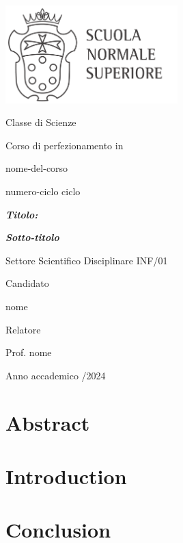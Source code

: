 \documentclass[12pt, draft, twoside]{report} %
\newcommand\la{\textlangle\xspace}
\newcommand\ra{\textrangle\xspace}
\begin{document}

\begin{titlepage}
{
\ifdefined\IsRoboto
{}\selectfont
\fi
    
   \centering
   \vspace*{-3.5cm}
   \includegraphics[width=0.5\textwidth]{sns_logo.pdf} 
   \par\vspace{2.5cm}

   {\Large Classe di Scienze\par}
   \vspace{0.5cm}
   {\Large Corso di perfezionamento in\par}
   {\Large \la nome-del-corso \ra\par}
   \vspace{0.5cm}
   {\Large \la numero-ciclo ciclo \ra \par}
   \vfill
   {\huge\bfseries \itshape \la Titolo: \ra \par}
   {\Large\bfseries \itshape \la Sotto-titolo \ra \par}
   \vspace{1.5cm}
   {\Large Settore Scientifico Disciplinare \la INF/01 \ra \par} %
   \vfill
   \raggedright
   {\Large Candidato\par}
   {\Large \la nome \ra \par}
   \vspace{1.5cm}
   {\large Relatore \par}
   {\large Prof. \la nome \ra \par}
   \vfill
   \centering
   {\large Anno accademico \la 2023/2024 \ra \par}
   \vspace*{-2.5cm}
   }
\end{titlepage}



\chapter*{Abstract}


\listoffigures

\listoftables

\tableofcontents
\newpage


\chapter{Introduction} \label{ch:intro}


\chapter{Conclusion} \label{ch:conclusions}



\end{document}

